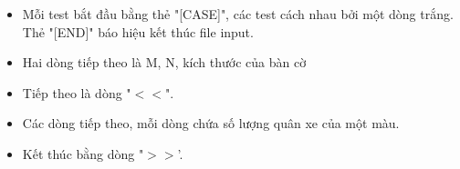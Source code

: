 \begin{itemize}
	\item     Mỗi test bắt đầu bằng thẻ "[CASE]", các test cách nhau bởi một dòng trắng. Thẻ "[END]" báo hiệu kết thúc file input.   
	\item     Hai dòng tiếp theo là M, N, kích thước của bàn cờ   
	\item     Tiếp theo là dòng "$<$$<$".   
	\item     Các dòng tiếp theo, mỗi dòng chứa số lượng quân xe của một màu.   
	\item     Kết thúc bằng dòng "$>$$>$'.   
\end{itemize}